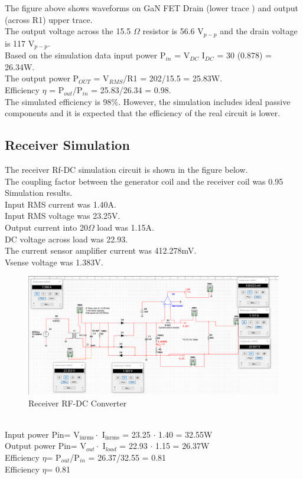 \documentclass[12pt]{article}
\begin{document}
\hfill \\
\pagebreak
\hfill \\
\indent
The figure above shows waveforms on GaN FET Drain (lower trace ) and output (across R1) upper trace.\\
The output voltage across the 15.5 $\Omega$ resistor is 56.6 V$_{p-p}$ and the drain voltage is 117 V$_{p-p}$.\\
Based on the simulation data input power P$_{in}$ = V$_{DC}$ I$_{DC}$ = 30 (0.878) = 26.34W.\\
The output power P$_{OUT}$ = V$_{RMS}$/R1 = 202/15.5 = 25.83W.\\
Efficiency $\eta$ = P$_{out}$/P$_{in}$ = 25.83/26.34 = 0.98.\\
The simulated efficiency is 98\%. However, the simulation includes ideal passive components and it is expected that the efficiency of the real circuit is lower. \\
\hfill
\pagebreak

\subsection{Receiver Simulation}
\noindent
The receiver Rf-DC simulation circuit is shown in the figure below.\\
The coupling factor between the generator coil and the receiver coil was 0.95\\
Simulation results.\\
Input RMS current was 1.40A.\\
Input RMS voltage was 23.25V.\\
Output current into 20$\Omega$ load was 1.15A.\\
DC voltage across load was 22.93.\\
The current sensor amplifier current was 412.278mV.\\
Vsense voltage was 1.383V. \\
\hfill
\begin{figure}[h!]
\centering
\includegraphics[width=1.0\linewidth]{sim_receiver}
\caption{Receiver RF-DC Converter}
\end{figure}
\hfill \\
\noindent
Input power Pin= V$_{\mathrm{in rms}} \cdot$ I$_{\mathrm{in rms}}$ = 23.25 $\cdot$ 1.40 = 32.55W\\
Output power Pin= V$_{out} \cdot$ I$_{load}$ = 22.93 $\cdot$ 1.15 = 26.37W\\
Efficiency $\eta$= P$_{out}$/P$_{in}$ = 26.37/32.55 = 0.81\\
Efficiency $\eta$= 0.81\\
\end{document}
